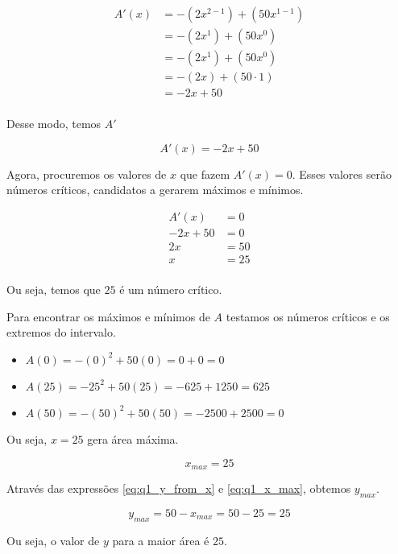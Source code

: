 \documentclass{article}
\begin{document}
\begin{align*}
    A'(x)
     & = -(2x^{2-1}) + (50x^{1-1}) \\
     & = -(2x^{1}) + (50x^{0})     \\
     & = -(2x^{1}) + (50x^{0})     \\
     & = -(2x) + (50\cdot 1)       \\
     & = -2x + 50                  \\
\end{align*}

Desse modo, temos \(A'\)

\begin{equation}\label{eq:q1_derivative_of_area}
    A'(x) = -2x + 50
\end{equation}

Agora, procuremos os valores de \(x\) que fazem \(A'(x) = 0\). Esses valores
serão números críticos, candidatos a gerarem máximos e mínimos.


\begin{align*}
    A'(x)
             & = 0  \\
    -2x + 50 & = 0  \\
    2x       & = 50 \\
    x        & = 25 \\
\end{align*}

Ou seja, temos que \(25\) é um número crítico.

Para encontrar os máximos e mínimos de \(A\) testamos os números críticos
e os extremos do intervalo.

\begin{itemize}
    \item \(A(0) = - (0)^2 + 50(0) = 0 + 0 = 0 \)
    \item \(A(25) = -25^2 + 50(25) = -625 + 1250 = 625  \)
    \item \(A(50) = - (50)^2 + 50(50) = -2500 + 2500 = 0  \)
\end{itemize}

Ou seja, \(x = 25\) gera área máxima.

\begin{equation}\label{eq:q1_x_max}
    x_{max} = 25
\end{equation}

Através das expressões \ref{eq:q1_y_from_x} e \ref{eq:q1_x_max},
obtemos \(y_{max}\).

\[
    y_{max} = 50 - x_{max} = 50 - 25 = 25
\]

Ou seja, o valor de \(y\) para a maior área é \(25\).
\end{document}
